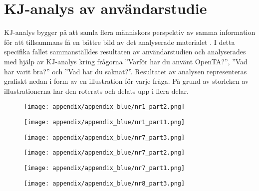 \section{KJ-analys av användarstudie}
\label{app:kjOpenTA}

KJ-analys bygger på att samla flera människors perspektiv av samma information för att tillsammans få en bättre bild av det analyserade materialet \cite{kj}. I detta specifika fallet sammanställdes resultaten av användarstudien och analyserades med hjälp av KJ-analys kring frågorna ''Varför har du använt OpenTA?'', ''Vad har varit bra?'' och ''Vad har du saknat?''. Resultatet av analysen representeras grafiskt nedan i form av en illustration för varje fråga. På grund av storleken av illustrationerna har den roterats och delats upp i flera delar. 


\begin{figure}[hbtp]
    \centering
    \texttt{[image: appendix/appendix\_blue/nr1\_part2.png]}
    \caption*{}
    \label{fig:nr1_part2}
\end{figure}

\begin{figure}[hbtp]
    \centering
    \texttt{[image: appendix/appendix\_blue/nr1\_part1.png]}
    \caption*{}
    \label{fig:nr1_part1}
\end{figure}


\begin{figure}[hbtp]
    \centering
    \texttt{[image: appendix/appendix\_blue/nr7\_part3.png]}
    \caption*{}
    \label{fig:nr7_part3}
\end{figure}

\begin{figure}[hbtp]
    \centering
    \texttt{[image: appendix/appendix\_blue/nr7\_part2.png]}
    \caption*{}
    \label{fig:nr7_part2}
\end{figure}

\begin{figure}[hbtp]
    \centering
    \texttt{[image: appendix/appendix\_blue/nr7\_part1.png]}
    \caption*{}
    \label{fig:nr7_part1}
\end{figure}


\begin{figure}[hbtp]
    \centering
    \texttt{[image: appendix/appendix\_blue/nr8\_part3.png]}
    \caption*{}
    \label{fig:nr8_part3}
\end{figure}

